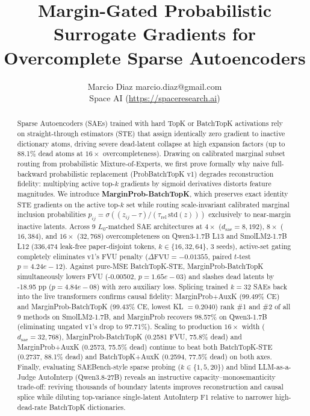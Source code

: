 \documentclass[10pt]{article}
\title{Margin-Gated Probabilistic Surrogate Gradients for Overcomplete Sparse Autoencoders}
\author{\name Marcio Diaz \email marcio.diaz@gmail.com \\
\addr Space AI (\url{https://spaceresearch.ai})}
\begin{document}
\maketitle
\begin{abstract}
Sparse Autoencoders (SAEs) trained with hard TopK or BatchTopK activations rely on straight-through estimators (STE) that assign identically zero gradient to inactive dictionary atoms, driving severe dead-latent collapse at high expansion factors (up to 88.1\% dead atoms at $16\times$ overcompleteness). Drawing on calibrated marginal subset routing from probabilistic Mixture-of-Experts, we first prove formally why naive full-backward probabilistic replacement (ProbBatchTopK v1) degrades reconstruction fidelity: multiplying active top-$k$ gradients by sigmoid derivatives distorts feature magnitudes. We introduce \textbf{MarginProb-BatchTopK}, which preserves exact identity STE gradients on the active top-$k$ set while routing scale-invariant calibrated marginal inclusion probabilities $p_{ij} = \sigma((z_{ij} - \tau)/(\tau_{\mathrm{rel}}\,\mathrm{std}(z)))$ exclusively to near-margin inactive latents. Across 9 $L_0$-matched SAE architectures at $4\times$ ($d_{\mathrm{sae}}=8{,}192$), $8\times$ ($16{,}384$), and $16\times$ ($32{,}768$) overcompleteness on Qwen3-1.7B L13 and SmolLM2-1.7B L12 (336,474 leak-free paper-disjoint tokens, $k \in \{16,32,64\}$, 3 seeds), active-set gating completely eliminates v1's FVU penalty ($\Delta\mathrm{FVU} = -0.01355$, paired $t$-test $p=4.24e-12$). Against pure-MSE BatchTopK-STE, MarginProb-BatchTopK simultaneously lowers FVU (-0.00502, $p=1.65e-03$) and slashes dead latents by -18.95 pp ($p=4.84e-08$) with zero auxiliary loss. Splicing trained $k=32$ SAEs back into the live transformers confirms causal fidelity: MarginProb+AuxK (99.49\% CE) and MarginProb-BatchTopK (99.43\% CE, lowest KL $=0.2040$) rank \#1 and \#2 of all 9 methods on SmolLM2-1.7B, and MarginProb recovers 98.57\% on Qwen3-1.7B (eliminating ungated v1's drop to 97.71\%). Scaling to production $16\times$ width ($d_{\mathrm{sae}}=32{,}768$), MarginProb-BatchTopK (0.2581 FVU, 75.8\% dead) and MarginProb+AuxK (0.2573, 75.5\% dead) continue to beat both BatchTopK-STE (0.2737, 88.1\% dead) and BatchTopK+AuxK (0.2594, 77.5\% dead) on both axes. Finally, evaluating SAEBench-style sparse probing ($k \in \{1,5,20\}$) and blind LLM-as-a-Judge AutoInterp (Qwen3.8-27B) reveals an instructive capacity--monosemanticity trade-off: reviving thousands of boundary latents improves reconstruction and causal splice while diluting top-variance single-latent AutoInterp F1 relative to narrower high-dead-rate BatchTopK dictionaries.
\end{abstract}
\end{document}

